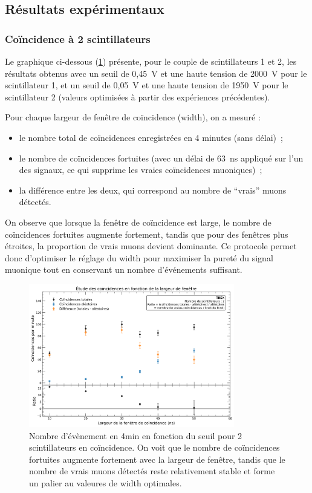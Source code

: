 \documentclass[a4paper,12pt,twoside]{article}
\begin{document}
\newpage

\subsection{Résultats expérimentaux}
\subsubsection{Coïncidence à 2 scintillateurs}

Le graphique ci-dessous (\ref{fig:coincidences_2_scintillateurs}) présente, pour le couple de scintillateurs 1 et 2, les résultats obtenus avec un seuil de 0{,}45~V et une haute tension de 2000~V pour le scintillateur 1, et un seuil de 0{,}05~V et une haute tension de 1950~V pour le scintillateur 2 (valeurs optimisées à partir des expériences précédentes).

Pour chaque largeur de fenêtre de coïncidence (width), on a mesuré :
\begin{itemize}
    \item le nombre total de coïncidences enregistrées en 4 minutes (sans délai)~;
    \item le nombre de coïncidences fortuites (avec un délai de 63~ns appliqué sur l’un des signaux, ce qui supprime les vraies coïncidences muoniques)~;
    \item la différence entre les deux, qui correspond au nombre de “vrais” muons détectés.
\end{itemize}

On observe que lorsque la fenêtre de coïncidence est large, le nombre de coïncidences fortuites augmente fortement, tandis que pour des fenêtres plus étroites, la proportion de vrais muons devient dominante. Ce protocole permet donc d’optimiser le réglage du width pour maximiser la pureté du signal muonique tout en conservant un nombre d’événements suffisant.


\begin{figure}[!h]
    \centering
    \includegraphics[width=0.8\textwidth]{Images/Coincidences_2_Scintillateurs.png}
    \caption[Nombre d’évènement en 4 min en fonction du seuil]{Nombre d’évènement en 4min en fonction du seuil pour 2 scintillateurs en coïncidence.
    On voit que le nombre de coïncidences fortuites augmente fortement avec la largeur de fenêtre, tandis que le nombre de vrais muons détectés reste relativement stable et forme un palier au valeures de width optimales.}
    \label{fig:coincidences_2_scintillateurs}
\end{figure}
\end{document}
